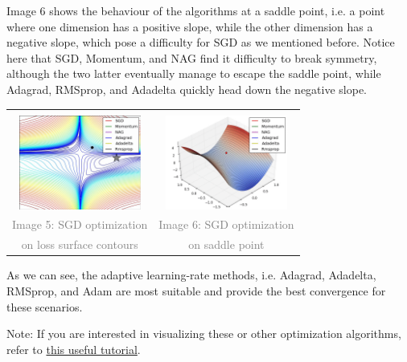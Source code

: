 \documentclass[4pt,journal,compsoc]{IEEEtran}
\begin{document}
\begin{flushleft}
    Image 6 shows the behaviour of the algorithms at a saddle point, i.e. a point where one dimension has a positive slope, while the other dimension has a negative slope, which pose a difficulty for SGD as we mentioned before. Notice here that SGD, Momentum, and NAG find it difficulty to break symmetry, although the two latter eventually manage to escape the saddle point, while Adagrad, RMSprop, and Adadelta quickly head down the negative slope. \newline
    
    \begin{tabular}{|c|c|} 
        \hline \\
        
        \includegraphics[width = 4cm]{P006.PNG} & \includegraphics[width = 4cm]{P007.PNG}\\ 
        
        \textcolor{gray}{Image 5: SGD optimization} &
        \textcolor{gray}{Image 6: SGD optimization} \\
        
        \textcolor{gray}{on loss surface contours} &
        \textcolor{gray}{on saddle point} \\
        \hline
    \end{tabular} \newline \newline
    
    As we can see, the adaptive learning-rate methods, i.e. Adagrad, Adadelta, RMSprop, and Adam are most suitable and provide the best convergence for these scenarios. \newline
    
    Note: If you are interested in visualizing these or other optimization algorithms, refer to \underline{this useful tutorial}. \newline \newline
    

\end{flushleft}
\end{document}

